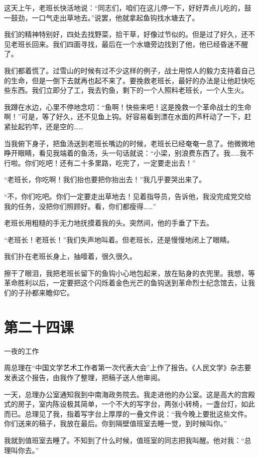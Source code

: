 \documentclass[12pt,UTF8]{ctexbook}
\begin{document}
这天上午，老班长快活地说：“同志们，咱们在这儿停一下，好好弄点儿吃的，鼓一鼓劲，一口气走出草地去。”说罢，他就拿起鱼钩找水塘去了。

我们的精神特别好，四处去找野菜，拾干草，好像过节似的。但是过了好久，还不见老班长回来。我们四面寻找，最后在一个水塘旁边找到了他，他已经昏迷不醒了。

我们都着慌了。过雪山的时候有过不少这样的例子，战士用惊人的毅力支持着自己的生命，但是一倒下去就再也起不来了。要挽救老班长，最好的办法是让他赶快吃些东西。我们立即分了工，我去钓鱼，剩下的一个人照料老班长，一个人生火。

我蹲在水边，心里不停地念叨：“鱼啊！快些来吧！这是挽救一个革命战士的生命啊！”可是，等了好久，还不见鱼上钩。好容易看到漂在水面的芦秆动了一下，赶紧扯起钓竿，还是空的……

当我俯下身子，把鱼汤送到老班长嘴边的时候，老班长已经奄奄一息了。他微微地睁开眼睛，看见我端着的鱼汤，头一句话就说：“小梁，别浪费东西了。我……我不行啦。你们吃吧！还有二十多里路，吃完了，一定要走出去！”

“老班长，你吃啊！我们抬也要把你抬出去！”我几乎要哭出来了。

“不，你们吃吧。你们一定要走出草地去！见着指导员，告诉他，我没完成党交给我的任务，没把你们照顾好。看，你们都瘦得……”

老班长用粗糙的手无力地抚摸着我的头。突然间，他的手垂了下去。

“老班长！老班长！”我们失声地叫着。但老班长，还是慢慢地闭上了眼睛。

我们扑在老班长身上，抽噎着，很久很久。

擦干了眼泪，我把老班长留下的鱼钩小心地包起来，放在贴身的衣兜里。我想，等革命胜利以后，一定要把这个闪烁着金色光芒的鱼钩送到革命烈士纪念馆去，让我们的子孙都来瞻仰它。

\section{第二十四课}

一夜的工作

周总理在“中国文学艺术工作者第一次代表大会”上作了报告。《人民文学》杂志要发表这个报告，由我作了整理，把稿子送人他审阅。

一天，总理办公室通知我到中南海政务院去。我走进他的办公室。这是高大的宫殿式的房子，室内陈设极其简单，一个不大的写字台，两张小转椅，一盏台灯，如此而已。总理见了我，指着写字台上厚厚的一叠文件说：“我今晚上要批这些文件。你们送来的稿子，我放在最后。你到隔壁值班室去睡一觉，到时候叫你。”

我就到值班室去睡了。不知到了什么时候，值班室的同志把我叫醒。他对我：“总理叫你去。”
\end{document}

